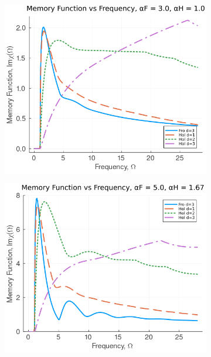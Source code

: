 \begin{figure}
\centering
  \begin{subfigure}[b]{0.49\textwidth}
    \includegraphics[width=\textwidth]{figures/im_mem_freq_3_1.png}
  \end{subfigure}
  \hfill
  \begin{subfigure}[b]{0.49\textwidth}
    \includegraphics[width=\textwidth]{figures/im_mem_freq_5_167.png}
  \end{subfigure}
  \begin{subfigure}[b]{0.49\textwidth}

\end{subfigure}
\end{figure}
